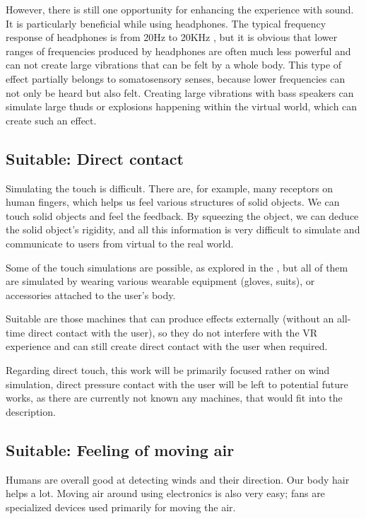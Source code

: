 However, there is still one opportunity for enhancing the experience with sound.
It is particularly beneficial while using headphones. The typical frequency
response of headphones is from 20Hz to 20KHz \hyperlink{freqresp}{}, but it is obvious
that lower ranges of frequencies produced by headphones are often much
less powerful and can not create large vibrations that can be felt by a whole
body. This type of effect partially belongs to somatosensory senses, because
lower frequencies can not only be heard but also felt. Creating large
vibrations with bass speakers can simulate large thuds or explosions
happening within the virtual world, which can create such an effect.


\hypertarget{x-suitable:-direct-contact}{\subsection{Suitable: Direct contact}}
Simulating the touch is difficult. There are, for example, many receptors on
human fingers, which helps us feel various structures of solid
objects. We can touch solid objects and feel the feedback. By squeezing the
object, we can deduce the solid object’s rigidity, and all this
information is very difficult to simulate and communicate to users from
virtual to the real world.


Some of the touch simulations are possible, as explored
in the \hyperlink{./03-current-state-of-effects#hapticexp}{}, but all
of them are simulated by wearing various wearable equipment (gloves, suits),
or accessories attached to the user’s body.


Suitable are those machines that can produce effects externally (without an
all-time direct contact with the user), so they do not interfere with the VR
experience and can still create direct contact with the user when required.


Regarding direct touch, this work will be primarily
focused rather on wind simulation, direct pressure contact with the user will
be left to potential future works, as there are currently not known any
machines, that would fit into the description.


\hypertarget{x-suitable:-feeling-of-moving-air}{\subsection{Suitable: Feeling of moving air}}
Humans are overall good at detecting winds and their direction. Our body hair
helps a lot. Moving air around using electronics is also very easy; fans
are specialized devices used primarily for moving the air.


